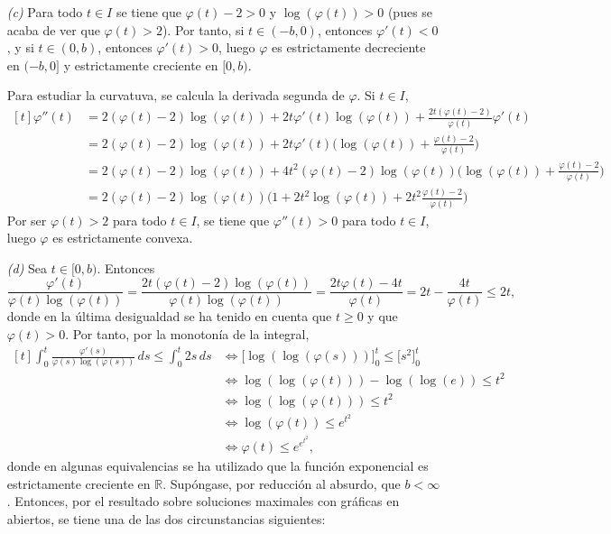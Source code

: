 \documentclass[11pt]{report}
\newcommand{\R}{\mathbb R}
\begin{document}
\begin{itemize}
    \item[\textit{(c)}] Para todo $t \in I$ se tiene que $\varphi(t)-2 >0$ y $\log(\varphi(t))>0$ (pues se acaba de ver que $\varphi(t)>2$). Por tanto, si $t \in (-b,0)$, entonces $\varphi'(t)<0$, y si $t \in (0,b)$, entonces $\varphi'(t)>0$, luego $\varphi$ es estrictamente decreciente en $(-b,0]$ y estrictamente creciente en $[0,b)$.

    \vspace{2mm}

    Para estudiar la curvatuva, se calcula la derivada segunda de $\varphi$. Si $t \in I$,
    \[\begin{aligned}[t]
        \varphi''(t)&=2(\varphi(t)-2)\log(\varphi(t))+2t\varphi'(t)\log(\varphi(t))+\frac{2t(\varphi(t)-2)}{\varphi(t)}\varphi'(t) \\
        &= 2(\varphi(t)-2)\log(\varphi(t))+2t\varphi'(t)\biggl(\log(\varphi(t))+\frac{\varphi(t)-2}{\varphi(t)}\biggr) \\
        &= 2(\varphi(t)-2)\log(\varphi(t))+4t^2(\varphi(t)-2)\log(\varphi(t))\biggl(\log(\varphi(t))+\frac{\varphi(t)-2}{\varphi(t)}\biggr) \\
        &=2(\varphi(t)-2)\log(\varphi(t))\biggl(1+2t^2\log(\varphi(t))+2t^2\frac{\varphi(t)-2}{\varphi(t)}\biggr)
    \end{aligned}\]
    Por ser $\varphi(t)>2$ para todo $t \in I$, se tiene que $\varphi''(t) > 0$ para todo $t \in I$, luego $\varphi$ es estrictamente convexa.
    \item[\textit{(d)}] Sea $t \in [0,b)$. Entonces
    \[\frac{\varphi'(t)}{\varphi(t)\log(\varphi(t))}=\frac{2t(\varphi(t)-2)\log(\varphi(t))}{\varphi(t)\log(\varphi(t))}=\frac{2t\varphi(t)-4t}{\varphi(t)}=2t-\frac{4t}{\varphi(t)} \leq 2t, \]
    donde en la última desigualdad se ha tenido en cuenta que $t \geq 0$ y que $\varphi(t)>0$. Por tanto, por la monotonía de la integral,
    \[
    \begin{aligned}[t]
        \int_0^t \frac{\varphi'(s)}{\varphi(s)\log(\varphi(s))} \, ds \leq \int_0^t 2s\, ds &\iff \bigl[\log(\log(\varphi(s)))\bigr]_0^t \leq \bigl[ s^2\bigr]_0^t \\
        &\iff \log(\log(\varphi(t)))-\log(\log(e)) \leq t^2 \\
        &\iff \log(\log(\varphi(t))) \leq t^2 \\
        &\iff \log(\varphi(t)) \leq e^{t^2} \\
        &\iff \varphi(t) \leq e^{e^{t^2}},
    \end{aligned}
    \]
    donde en algunas equivalencias se ha utilizado que la función exponencial es estrictamente creciente en $\R$. Supóngase, por reducción al absurdo, que $b < \infty$. Entonces, por el resultado sobre soluciones maximales con gráficas en abiertos, se tiene una de las dos circunstancias siguientes:

\end{itemize}
\end{document}
